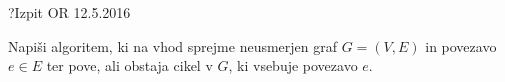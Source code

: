 \begin{naloga}{?}{Izpit OR 12.5.2016}
\begin{vprasanje}
Napiši algoritem,
ki na vhod sprejme neusmerjen graf $G = (V, E)$ in povezavo $e \in E$
ter pove, ali obstaja cikel v $G$, ki vsebuje povezavo $e$.
\end{vprasanje}
\begin{odgovor}
\end{odgovor}
\end{naloga}

